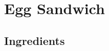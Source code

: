 \thispagestyle{fancy}
\section{Egg Sandwich}
\AddToShipoutPicture*{\EggSandwich}

\subsection*{Ingredients}
